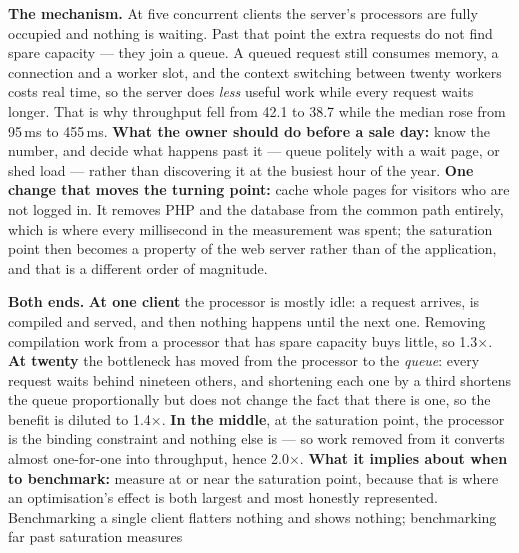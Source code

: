 \begin{ans}
  \item \textbf{The mechanism.} At five concurrent clients the server's
        processors are fully occupied and nothing is waiting. Past that point
        the extra requests do not find spare capacity --- they join a queue. A
        queued request still consumes memory, a connection and a worker slot,
        and the context switching between twenty workers costs real time, so
        the server does \emph{less} useful work while every request waits
        longer. That is why throughput fell from 42.1 to 38.7 while the median
        rose from 95\,ms to 455\,ms. \textbf{What the owner should do before a
        sale day:} know the number, and decide what happens past it --- queue
        politely with a wait page, or shed load --- rather than discovering it
        at the busiest hour of the year. \textbf{One change that moves the
        turning point:} cache whole pages for visitors who are not logged in.
        It removes PHP and the database from the common path entirely, which is
        where every millisecond in the measurement was spent; the saturation
        point then becomes a property of the web server rather than of the
        application, and that is a different order of magnitude.
  \item \textbf{Both ends.} \textbf{At one client} the processor is mostly
        idle: a request arrives, is compiled and served, and then nothing
        happens until the next one. Removing compilation work from a processor
        that has spare capacity buys little, so 1.3$\times$. \textbf{At twenty}
        the bottleneck has moved from the processor to the \emph{queue}: every
        request waits behind nineteen others, and shortening each one by a
        third shortens the queue proportionally but does not change the fact
        that there is one, so the benefit is diluted to 1.4$\times$. \textbf{In
        the middle}, at the saturation point, the processor is the binding
        constraint and nothing else is --- so work removed from it converts
        almost one-for-one into throughput, hence 2.0$\times$. \textbf{What it
        implies about when to benchmark:} measure at or near the saturation
        point, because that is where an optimisation's effect is both largest
        and most honestly represented. Benchmarking a single client flatters
        nothing and shows nothing; benchmarking far past saturation measures

\end{ans}
